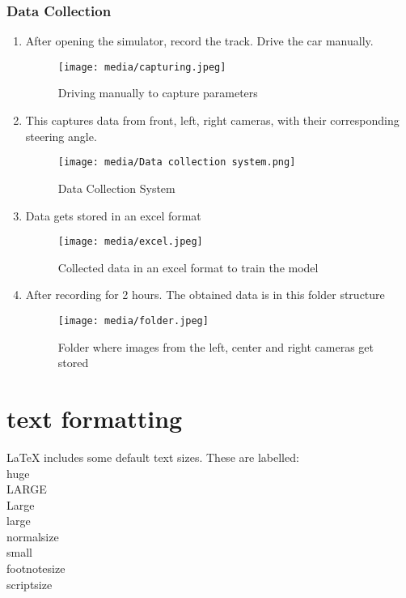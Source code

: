 \documentclass[ 12pt,a4paper,twocolumn,fleqn]{article}
\begin{document}
\subsubsection{Data Collection}
\begin{enumerate}
    \item After opening the simulator, record the track. Drive the car manually. 
    \begin{figure}[H]
    \texttt{[image: media/capturing.jpeg]}
    \centering
    \caption{Driving manually to capture parameters}
    \end{figure}
    \item This captures data from front, left, right cameras, with their corresponding steering angle. 
    \begin{figure}[H]
    \texttt{[image: media/Data collection system.png]}
    \centering
    \caption{Data Collection System}
    \end{figure}
    \item Data gets stored in an excel format
    \begin{figure}[H]
    \texttt{[image: media/excel.jpeg]}
    \centering
    \caption{Collected data in an excel format to train the model}
    \end{figure}
    \item After recording for 2 hours. The obtained data is in this folder structure
    \begin{figure}[H]
    \texttt{[image: media/folder.jpeg]}
    \centering
    \caption{Folder where images from the left, center and right cameras get stored}
    \end{figure}
    
    
\end{enumerate}





















\section{text formatting}
\LaTeX{} includes some default text sizes. These are labelled: \\
\huge{huge} \\
\LARGE{LARGE} \\
\Large{Large} \\
\large{large} \\
\normalsize{normalsize} \\
\small{small} \\
\footnotesize{footnotesize} \\
\scriptsize{scriptsize}
\newpage
  \pagestyle{fancy}
\thisfancypage{%
  \setlength{\fboxsep}{20pt}\doublebox}{}
\normalsize
\end{document}
